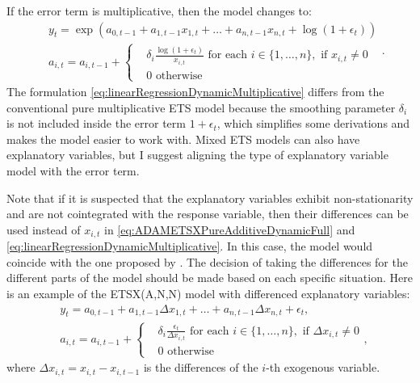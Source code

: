 \documentclass[]{book}
\theoremstyle{definition}
\theoremstyle{definition}
\theoremstyle{definition}
\theoremstyle{definition}
\theoremstyle{remark}
\begin{document}
If the error term is multiplicative, then the model changes to:
\begin{equation}
  \begin{aligned}
    & y_{t} = \exp \left(a_{0,t-1} + a_{1,t-1} x_{1,t} + \dots + a_{n,t-1} x_{n,t} + \log(1+ \epsilon_t) \right) \\
    & a_{i,t} = a_{i,t-1} + \left \lbrace \begin{aligned}
                  &\delta_i \frac{\log(1+\epsilon_t)}{x_{i,t}} \text{ for each } i \in \{1, \dots, n\}, \text{ if } x_{i,t}\neq 0 \\
                  &0 \text{ otherwise }
            \end{aligned} \right.
  \end{aligned} .
  \label{eq:linearRegressionDynamicMultiplicative}
\end{equation}
The formulation \eqref{eq:linearRegressionDynamicMultiplicative} differs from the conventional pure multiplicative ETS model because the smoothing parameter \(\delta_i\) is not included inside the error term \(1+\epsilon_t\), which simplifies some derivations and makes the model easier to work with. Mixed ETS models can also have explanatory variables, but I suggest aligning the type of explanatory variable model with the error term.

Note that if it is suspected that the explanatory variables exhibit non-stationarity and are not cointegrated with the response variable, then their differences can be used instead of \(x_{i,t}\) in \eqref{eq:ADAMETSXPureAdditiveDynamicFull} and \eqref{eq:linearRegressionDynamicMultiplicative}. In this case, the model would coincide with the one proposed by \citet{Osman2015}. The decision of taking the differences for the different parts of the model should be made based on each specific situation. Here is an example of the ETSX(A,N,N) model with differenced explanatory variables:
\begin{equation}
  \begin{aligned}
    & y_{t} = a_{0,t-1} + a_{1,t-1} \Delta x_{1,t} + \dots + a_{n,t-1} \Delta x_{n,t} + \epsilon_t , \\
    & a_{i,t} = a_{i,t-1} + \left \lbrace \begin{aligned}
                  &\delta_i \frac{\epsilon_t}{\Delta x_{i,t}} \text{ for each } i \in \{1, \dots, n\}, \text{ if } \Delta x_{i,t}\neq 0 \\
                  &0 \text{ otherwise }
            \end{aligned} \right. ,
  \end{aligned}
  \label{eq:linearRegressionDynamicDifferences}
\end{equation}
where \(\Delta x_{i,t} = x_{i,t} -x_{i,t-1}\) is the differences of the \(i\)-th exogenous variable.
\end{document}
